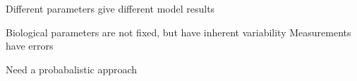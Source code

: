 \documentclass[presentation]{beamer}
\begin{document}
\begin{frame}{Different parameters give different model results}
    \begin{figure}
      \end{figure}

\end{frame}



\begin{frame}{}

Biological parameters are not fixed, but have inherent variability
Measurements have errors

Need a probabalistic approach

\end{frame}

\end{document}
